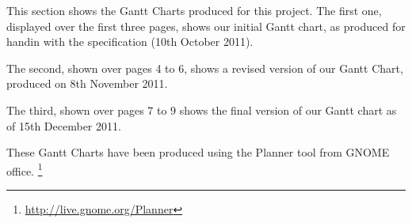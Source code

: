 
\label{appendix:gantt}
This section shows the Gantt Charts produced for this project. The first one, 
displayed over the first three pages, shows our initial Gantt chart, as 
produced for handin with the specification (10th October 2011).

The second, shown over pages 4 to 6, shows a revised version of our Gantt 
Chart, produced on 8th November 2011.

The third, shown over pages 7 to 9 shows the final version of our Gantt chart as of
15th December 2011.

These Gantt Charts have been produced using the Planner tool from GNOME office.
\footnote{\url{http://live.gnome.org/Planner}}




